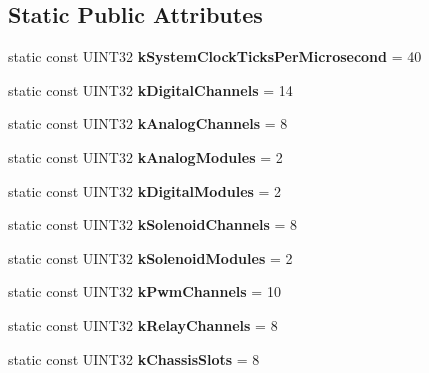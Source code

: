 \subsection*{Static Public Attributes}
\begin{DoxyCompactItemize}
\item 
\hypertarget{classSensorBase_a62b93c02393e42cb99cb02f2ea5c3210}{
static const UINT32 {\bfseries kSystemClockTicksPerMicrosecond} = 40}
\label{classSensorBase_a62b93c02393e42cb99cb02f2ea5c3210}

\item 
\hypertarget{classSensorBase_a7f940856e53b128fdf79e02a0847f698}{
static const UINT32 {\bfseries kDigitalChannels} = 14}
\label{classSensorBase_a7f940856e53b128fdf79e02a0847f698}

\item 
\hypertarget{classSensorBase_ab2640677a9876b6d9931a64e49fe1854}{
static const UINT32 {\bfseries kAnalogChannels} = 8}
\label{classSensorBase_ab2640677a9876b6d9931a64e49fe1854}

\item 
\hypertarget{classSensorBase_ae26b98f1438498ca476792ed36885717}{
static const UINT32 {\bfseries kAnalogModules} = 2}
\label{classSensorBase_ae26b98f1438498ca476792ed36885717}

\item 
\hypertarget{classSensorBase_a61358418acb62c70a31e34c2066ae005}{
static const UINT32 {\bfseries kDigitalModules} = 2}
\label{classSensorBase_a61358418acb62c70a31e34c2066ae005}

\item 
\hypertarget{classSensorBase_a94aa98723f06c8d3db4392a3570c37ee}{
static const UINT32 {\bfseries kSolenoidChannels} = 8}
\label{classSensorBase_a94aa98723f06c8d3db4392a3570c37ee}

\item 
\hypertarget{classSensorBase_ac2bbf6ee96fced8af6e08459461c377a}{
static const UINT32 {\bfseries kSolenoidModules} = 2}
\label{classSensorBase_ac2bbf6ee96fced8af6e08459461c377a}

\item 
\hypertarget{classSensorBase_a245dda830a4dbc0de6e3482aa17c5681}{
static const UINT32 {\bfseries kPwmChannels} = 10}
\label{classSensorBase_a245dda830a4dbc0de6e3482aa17c5681}

\item 
\hypertarget{classSensorBase_aa9042b498388c6ab62378a8672d81ddf}{
static const UINT32 {\bfseries kRelayChannels} = 8}
\label{classSensorBase_aa9042b498388c6ab62378a8672d81ddf}

\item 
\hypertarget{classSensorBase_a6a758308e49ed0f04b34d3f39c7db91a}{
static const UINT32 {\bfseries kChassisSlots} = 8}
\label{classSensorBase_a6a758308e49ed0f04b34d3f39c7db91a}

\end{DoxyCompactItemize}

